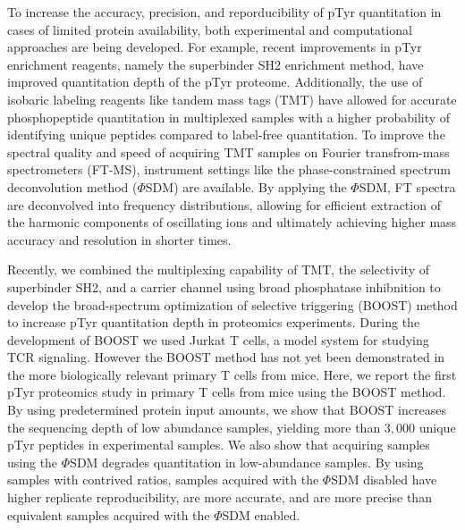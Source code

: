 \documentclass[journal=jprobs,manuscript=article]{achemso}
\begin{document}



To increase the accuracy, precision, and reporducibility of pTyr quantitation in cases of limited protein availability, both experimental and computational approaches are being developed. For example, recent improvements in pTyr enrichment reagents, namely the superbinder SH2 enrichment method\cite{kaneko2012superbinder,bian2016ultra,dong2017sensitive,tong2017protein,yao2018sh2,yao2019one}, have improved quantitation depth of the pTyr proteome\cite{chua2020tandem,chua2021ovalbumin,griffith2021silac}. Additionally, the use of isobaric labeling reagents like tandem mass tags (TMT) have allowed for accurate phosphopeptide quantitation in multiplexed samples with a higher probability of identifying unique peptides compared to label-free quantitation\cite{thompson2003tandem,wiese2007protein,werner2012high,mcalister2012increasing,o2018proteome,thompson2019tmtpro}. To improve the spectral quality and speed of acquiring TMT samples on Fourier transfrom-mass spectrometers (FT-MS), instrument settings like the phase-constrained spectrum deconvolution method ($\Phi$SDM) are available. By applying the $\Phi$SDM, FT spectra are deconvolved into frequency distributions, allowing for efficient extraction of the harmonic components of oscillating ions and ultimately achieving higher mass accuracy and resolution in shorter times\cite{grinfeld2017phase}.


Recently, we combined the multiplexing capability of TMT, the selectivity of superbinder SH2, and a carrier channel using broad phosphatase inhibnition to develop the broad-spectrum optimization of selective triggering (BOOST) method to increase pTyr quantitation depth in proteomics experiments\cite{chua2020tandem}. During the development of BOOST we used Jurkat T cells, a model system for studying TCR signaling\cite{abraham2004jurkat}. However the BOOST method has not yet been demonstrated in the more biologically relevant primary T cells from mice. Here, we report the first pTyr proteomics study in primary T cells from mice using the BOOST method. By using predetermined protein input amounts, we show that BOOST increases the sequencing depth of low abundance samples, yielding more than $3{,}000$ unique pTyr peptides in experimental samples. We also show that acquiring samples using the $\Phi$SDM degrades quantitation in low-abundance samples. By using samples with contrived ratios, samples acquired with the $\Phi$SDM disabled have higher replicate reproducibility, are more accurate, and are more precise than equivalent samples acquired with the $\Phi$SDM enabled.
\end{document}
